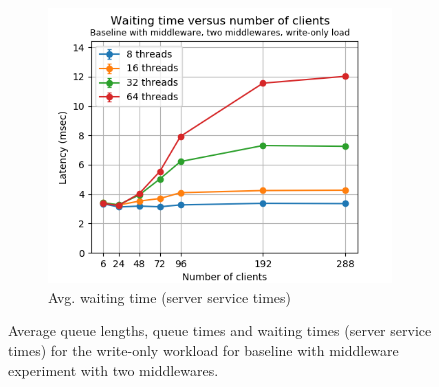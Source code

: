 \documentclass[11pt,a4paper]{article}
\begin{document}
\begin{figure}[h]
\begin{subfigure}{.33\textwidth}
\end{subfigure}%
\begin{subfigure}{.33\textwidth}
  \centering
  \includegraphics[width=1.0\linewidth,trim={0px 0px 0px 0px},clip]{img/plot/mwb2-wo-wtime-mini.png}
  \caption{Avg. waiting time (server service times)}
  \label{fig:mwb2-wo-wtime-mini}
\end{subfigure}
\caption{Average queue lengths, queue times and waiting times (server service times) for the write-only workload for baseline with middleware experiment with two middlewares.}
\label{fig:mwb2-wo-mini}
\end{figure}
\end{document}
